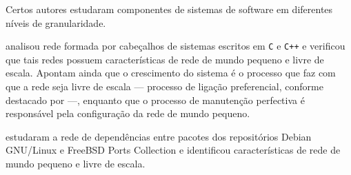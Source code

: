 Certos autores estudaram componentes de sistemas de software em diferentes
níveis de granularidade.

 analisou rede formada por cabeçalhos de
sistemas escritos em \texttt{C} e \texttt{C++} e verificou que tais redes
possuem características de rede de mundo pequeno e livre de escala.
Apontam ainda que o crescimento do sistema é o processo que faz com que a rede
seja livre de escala --- processo de ligação preferencial, conforme destacado
por  ---, enquanto que o processo de
manutenção perfectiva é responsável pela configuração da rede de mundo pequeno.

 estudaram a rede de dependências entre
pacotes dos repositórios Debian GNU/Linux e FreeBSD Ports Collection e
identificou características de rede de mundo pequeno e livre de escala.




